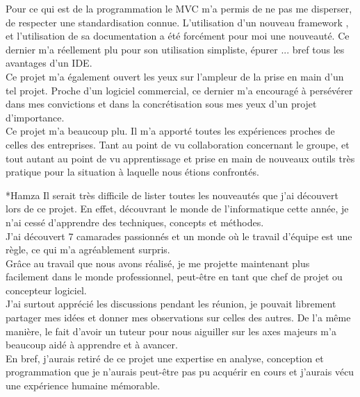\documentclass[a4paper, 12pt]{report}
\begin{document}
\begin{chapter}
\begin{section}
		Pour ce qui est de la programmation le MVC m'a permis de ne pas me disperser, de respecter une standardisation connue. L'utilisation d'un 
		nouveau framework , et l'utilisation de sa documentation a été forcément pour moi une nouveauté. Ce dernier m'a réellement plu pour son
		utilisation simpliste, épurer ... bref tous les avantages d'un IDE.\\

		Ce projet m'a également ouvert les yeux sur l'ampleur de la prise en main d'un tel projet. Proche d'un logiciel commercial, ce dernier m'a
		encouragé à persévérer dans mes convictions et dans la concrétisation sous mes yeux d'un projet d'importance.\\ 

		Ce projet m'a beaucoup plu. Il m'a apporté toutes les expériences proches de celles des entreprises. Tant au point de vu collaboration
		concernant le groupe, et tout autant au point de vu apprentissage et prise en main de nouveaux outils très pratique pour la situation à
		laquelle nous étions confrontés.\\
		\end{section}

		\begin{section}*{Hamza}
		Il serait très difficile de lister toutes les nouveautés que j'ai découvert lors de ce projet. En effet, découvrant le monde de l'informatique
		cette année, je n'ai cessé d'apprendre des techniques, concepts et méthodes.\\

		J'ai découvert 7 camarades passionnés et un monde où le travail d'équipe est une règle, ce qui m'a agréablement surpris.\\
		Grâce au travail que nous avons réalisé, je me projette maintenant plus facilement dans le monde professionnel, peut-être en tant
		que chef de projet ou concepteur logiciel.\\

		J'ai surtout apprécié les discussions pendant les réunion, je pouvait librement partager mes idées et donner mes observations sur
		celles des autres. De l'a même manière, le fait d'avoir un tuteur pour nous aiguiller sur les axes majeurs m'a beaucoup aidé à apprendre
		et à avancer.\\

		En bref, j'aurais retiré de ce projet une expertise en analyse, conception et programmation que je n'aurais peut-être pas pu acquérir en
		cours et j'aurais vécu une expérience humaine mémorable.
		\end{section}


\end{chapter}
\end{document}
